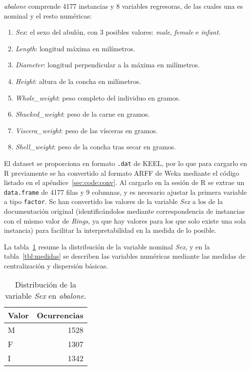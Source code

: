 \documentclass[a4paper, 11pt]{article}
\begin{document}
\textit{abalone} comprende 4177 instancias y 8 variables regresoras, de las cuales una es nominal y el resto numéricas:
\begin{enumerate}
\item \textit{Sex}: el sexo del abulón, con 3 posibles valores: \textit{male}, \textit{female} e \textit{infant}.
\item \textit{Length}: longitud máxima en milímetros.
\item \textit{Diameter}: longitud perpendicular a la máxima en milímetros.
\item \textit{Height}: altura de la concha en milímetros.
\item \textit{Whole\_weight}: peso completo del individuo en gramos.
\item \textit{Shucked\_weight}: peso de la carne en gramos.
\item \textit{Viscera\_weight}: peso de las vísceras en gramos.
\item \textit{Shell\_weight}: peso de la concha tras secar en gramos.
\end{enumerate}

El dataset se proporciona en formato \texttt{.dat} de KEEL, por lo que para cargarlo en R previamente se ha convertido al formato ARFF de Weka mediante el código listado en el apéndice~\ref{sec:code:conv}. Al cargarlo en la sesión de R se extrae un \texttt{data.frame} de 4177 filas y 9 columnas, y es necesario ajustar la primera variable a tipo \texttt{factor}. Se han convertido los valores de la variable \textit{Sex} a los de la documentación original (identificándolos mediante correspondencia de instancias con el mismo valor de \textit{Rings}, ya que hay valores para los que solo existe una sola instancia) para facilitar la interpretabilidad en la medida de lo posible.

La tabla~\ref{tbl:cuenta} resume la distribución de la variable nominal \textit{Sex}, y en la tabla~\ref{tbl:medidas} se describen las variables numéricas mediante las medidas de centralización y dispersión básicas.

\begin{table}[ht]
  \caption{\label{tbl:cuenta}Distribución de la variable \textit{Sex} en \textit{abalone}.}
  
  \begin{tabular}[c]{l||r}
    Valor & Ocurrencias \\
    \hline
    M & 1528 \\
    F & 1307 \\
    I & 1342
  \end{tabular}
\end{table}
\end{document}
